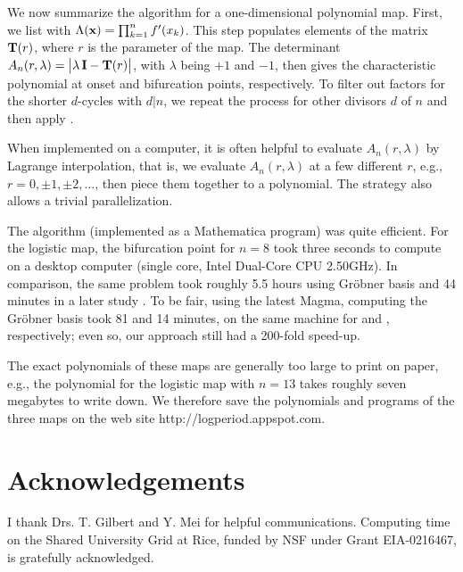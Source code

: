 \documentclass[twocolumn]{revtex4-1}
\begin{document}
We now summarize the algorithm for a one-dimensional polynomial map.
%
First, we list   with $\Lambda(\mathbf{x}) = \prod_{k=1}^n f'(x_k)$.
This step populates elements of the matrix $\mathbf{T}(r)$,
where $r$ is the parameter of the map.
%
The determinant $A_n(r, \lambda) = \big|\lambda \, \mathbf{I} - \mathbf{T}(r)\big|$,
with $\lambda$ being $+1$ and $-1$, then gives the characteristic
polynomial at onset and bifurcation points, respectively.
%
To filter out factors for the shorter $d$-cycles with $d|n$,
  we repeat the process for other divisors $d$ of $n$
  and then apply .
%


When implemented on a computer,
it is often helpful to evaluate $A_n(r,\lambda)$ by Lagrange interpolation,
that is, we evaluate $A_n(r, \lambda)$ at a few different $r$,
e.g., $r = 0, \pm1, \pm2,\ldots$, then piece them together
to a polynomial.
The strategy also allows a trivial parallelization.



The algorithm (implemented as a Mathematica program)
was quite efficient.
%
For the logistic map, the bifurcation point for $n = 8$
took three seconds to compute on a desktop computer
(single core, Intel\textsuperscript{\textregistered} Dual-Core CPU 2.50GHz).
%
In comparison,
  the same problem took roughly 5.5 hours \cite{kk1}
  using Gr\"obner basis
  and 44 minutes in a later study \cite{lewis}.
To be fair, using the latest Magma, computing the Gr\"obner basis
  took 81 and 14 minutes, on the same machine
  for  and , respectively;
even so, our approach still had a 200-fold speed-up.




%
The exact polynomials of these maps are generally too large to print on paper,
  e.g., the polynomial for the logistic map with $n = 13$
    takes roughly seven megabytes to write down.
%
We therefore save the polynomials and programs of the three maps on the web site
http://logperiod.appspot.com.




\section*{Acknowledgements}

I thank Drs. T. Gilbert and Y. Mei for helpful communications.
Computing time on the Shared University Grid at Rice,
funded by NSF under Grant EIA-0216467, is gratefully acknowledged.
\end{document}
